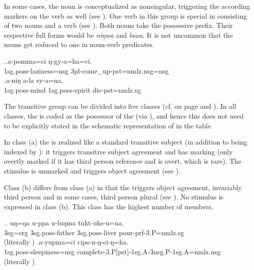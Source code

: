 In some cases, the noun is conceptualized as nonsingular, triggering  the according   markers on the verb as well (see \Next[a]). One verb in this group is special in consisting of  two nouns and a verb  (see \Next[b]). Both nouns take the possessive prefix. Their respective full forms would be \emph{niŋwa} and \emph{lawa}. It is not uncommon that the nouns get reduced to one  in noun-verb predicates.

\ex.\ag.a-pomma=ci ŋ-gy-a=ha=ci.\\
{\sc 1sg.poss-}laziness{\sc =nsg} {\sc 3pl-}come\_up{\sc -pst=nmlz.nsg=nsg}\\
\bg.a-niŋ a-la sy-a=na.\\
{\sc 1sg.poss-}mind {\sc 1sg.poss-}spirit die{\sc [3sg]-pst=nmlz.sg}\\



The transitive group can be divided into five classes (cf.  on page \pageref{tab-exp2} and \pageref{tab-exp2c}). In all classes, the  is coded as the possessor of the  (via ), and hence this does not need to be explicitly stated in the schematic representation of  in the table. 

In class (a) the  is realized like a standard transitive subject (in addition to being indexed by ): it  triggers transitive subject agreement and has   marking (only overtly marked if it has third person reference and is overt, which is rare). The stimulus is unmarked and triggers object agreement (see \Next[a]). 

Class (b) differs from class (a) in that the  triggers object agreement, invariably third person and in some cases, third person plural (see \Next[b]). No stimulus is expressed in class (b). This class has the highest number of members. 

 \ex.\ag. uŋ=ŋa   u-ppa             u-luŋma  tukt-uks-u=na.\\
{\sc 3sg=erg} {\sc 3sg.poss-}father {\sc 3sg.poss-}liver pour{\sc -prf-3.P=nmlz.sg}\\
 (literally )
\bg.\label{ex-yupmaci}a-yupma=ci cips-u-ŋ-ci-ŋ=ha.\\
 {\sc 1sg.poss-}sleepiness{\sc =nsg} complete{\sc -3.P[pst]-1sg.A-3nsg.P-1sg.A=nmlz.nsg}\\
 (literally )

